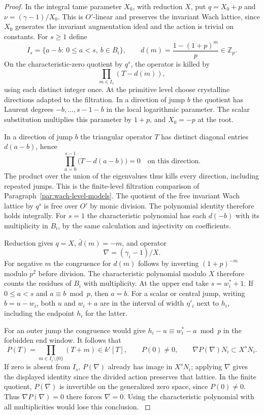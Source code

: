 \begin{proof}
In the integral tame parameter \(X_0\), with reduction \(X\),
put \(q=X_0+p\) and \(\nu=(\gamma-1)/X_0\). This is
\(O'\)-linear and preserves the invariant Wach lattice, since
\(X_0\) generates the invariant augmentation ideal and the
action is trivial on constants. For \(s\ge1\) define
\[
 I_s=\{a-b:\ 0\le a<s,\ b\in B_i\},\qquad
 d(m)=\frac{1-(1+p)^m}{p}\in\mathbb Z_p .
\]
On the characteristic-zero quotient by \(q^s\), the operator
is killed by
\[
 \prod_{m\in I_s}(T-d(m)),
\]
using each distinct
integer once. At the primitive level choose crystalline directions
adapted to the filtration. In a direction of jump \(b\) the
quotient has Laurent degrees \(-b,\ldots,s-1-b\) in the
local logarithmic parameter. The scalar substitution multiplies
this parameter by \(1+p\), and \(X_0=-p\) at the root.

In a direction of jump \(b\) the triangular operator \(T\) has distinct diagonal entries \(d(a-b)\), hence
\[
 \prod_{a=0}^{s-1}\big(T-d(a-b)\big)=0
 \quad\text{on this direction}.
\]
The product over the union of the eigenvalues thus kills every direction, including repeated jumps.
This is the finite-level filtration comparison of
Paragraph~\ref{par:wach-level-models}. The quotient of the
free invariant Wach lattice by \(q^s\) is free over \(O'\)
by monic division. The polynomial identity therefore holds
integrally. For \(s=1\) the characteristic polynomial has each
\(d(-b)\) with its multiplicity in \(B_i\), by the same
calculation and injectivity on coefficients.
\label{cor:residue-wach-realization-2}

Reduction gives \(q=X\), \(\bar d(m)=-m\), and operator
\[
 \nabla=(\gamma_i-1)/X.
\]
For negative \(m\) the congruence
for \(d(m)\) follows by inverting \((1+p)^{-m}\) modulo \(p^2\)
before division. The characteristic polynomial modulo \(X\)
therefore counts the residues of \(B_i\) with multiplicity.
At the upper end take \(s=w_i^*+1\). If \(0\le a<s\) and
\(a\equiv b\bmod p\), then \(a=b\). For a scalar or central
jump, writing \(b=u-w_i\), both \(u\) and \(w_i+a\) are in
the interval of width \(\eta'_i\) next to \(h_i\), including
the endpoint \(h_i\) for the latter.

For an outer jump the
congruence would give \(h_i-u\equiv w_i^*-a\bmod p\) in the
forbidden end window. It follows that
\[
   P(T)=\prod_{m\in I_s\setminus\{0\}}(T+m)\in k'[T],
   \qquad P(0)\ne0,\qquad
   \nabla P(\nabla)N_i\subset X^sN_i .
\]
If zero is absent from \(I_s\), \(P(\nabla)\) already has
image in \(X^sN_i\); applying \(\nabla\) gives the
displayed identity since the divided action preserves that
lattice. In the finite quotient, \(P(\nabla)\) is invertible
on the generalized zero space, since \(P(0)\ne0\). Thus
\(\nabla P(\nabla)=0\) there forces \(\nabla=0\). Using
the characteristic polynomial with all multiplicities would
lose this conclusion. \label{cor:residue-wach-realization-3}
\end{proof}

